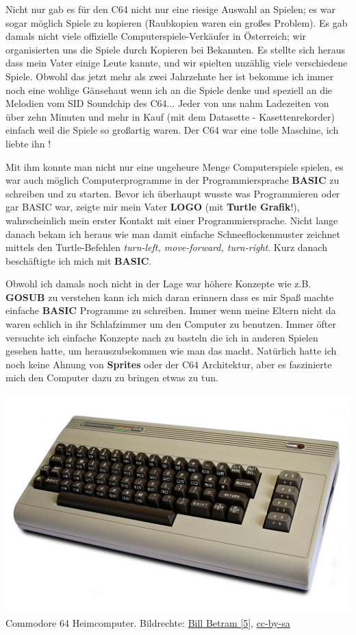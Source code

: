 Nicht nur gab es für den C64 nicht nur eine riesige Auswahl an Spielen; es war sogar möglich Spiele zu kopieren (Raubkopien waren ein großes Problem). Es gab damals nicht viele offizielle Computerspiele-Verkäufer in Österreich; wir organisierten uns die Spiele durch Kopieren bei Bekannten.  Es stellte sich heraus dass mein Vater einige Leute kannte, und wir spielten unzählig viele verschiedene Spiele. Obwohl das jetzt mehr als zwei Jahrzehnte her ist bekomme ich immer noch eine wohlige Gänsehaut wenn ich an die Spiele denke und speziell an die Melodien vom SID Soundchip des C64...  Jeder von uns nahm Ladezeiten von über zehn Minuten und mehr in Kauf (mit dem Datasette - Kasettenrekorder) einfach weil die Spiele so großartig waren. Der C64 war eine tolle Maschine, ich liebte ihn !

Mit ihm konnte man nicht nur eine ungeheure Menge Computerspiele spielen, es war auch möglich Computerprogramme in der Programmiersprache \textbf{BASIC} zu schreiben und zu starten. Bevor ich überhaupt wusste was Programmieren oder gar BASIC war, zeigte mir mein Vater \textbf{LOGO} (mit \textbf{Turtle Grafik}!), wahrscheinlich mein erster Kontakt mit einer Programmiersprache. Nicht lange danach bekam ich heraus wie man damit einfache Schneeflockenmuster zeichnet mittels den Turtle-Befehlen \textit{turn-left, move-forward, turn-right}. Kurz danach beschäftigte ich mich mit \textbf{BASIC}.

Obwohl ich damals noch nicht in der Lage war höhere Konzepte wie z.B. \textbf{GOSUB} zu verstehen kann ich mich daran erinnern dass es mir Spaß machte einfache \textbf{BASIC} Programme zu schreiben. Immer wenn meine Eltern nicht da waren schlich in ihr Schlafzimmer um den Computer zu benutzen. Immer öfter versuchte ich einfache Konzepte nach zu basteln die ich in anderen Spielen gesehen hatte, um herauszubekommen wie man das macht. Natürlich hatte ich noch keine Ahnung von \textbf{Sprites} oder der C64 Architektur, aber es faszinierte mich den Computer dazu zu bringen etwas zu tun.

\begin{center}
\includegraphics[width=0.9\linewidth]{austrianguy/austrianguy-c64.jpg}\\
\footnotesize{Commodore 64 Heimcomputer. Bildrechte: \href{https://commons.wikimedia.org/wiki/File:Commodore64.jpg}{Bill Betram [5]}, \href{https://creativecommons.org/licenses/by-sa/2.5/deed.en}{cc-by-sa}}
\end{center}

